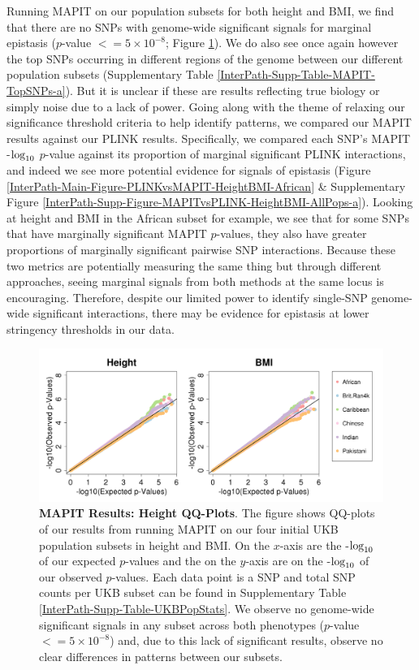 \documentclass[12pt,a4paper]{article}
\def\log{{\rm log}}
\begin{document}
Running MAPIT on our population subsets for both height and BMI, we find that there are no SNPs with genome-wide significant signals for marginal epistasis ($p$-value $<= 5\times10^{-8}$; Figure \ref{InterPath-Main-Figure-MAPIT-HeightBMI}). We do also see once again however the top SNPs occurring in different regions of the genome between our different population subsets (Supplementary Table \ref{InterPath-Supp-Table-MAPIT-TopSNPs-a}). But it is unclear if these are results reflecting true biology or simply noise due to a lack of power. Going along with the theme of relaxing our significance threshold criteria to help identify patterns, we compared our MAPIT results against our PLINK results. Specifically, we compared each SNP's MAPIT -$\log_{10}$ $p$-value against its proportion of marginal significant PLINK interactions, and indeed we see more potential evidence for signals of epistasis (Figure \ref{InterPath-Main-Figure-PLINKvsMAPIT-HeightBMI-African} \& Supplementary Figure \ref{InterPath-Supp-Figure-MAPITvsPLINK-HeightBMI-AllPops-a}). Looking at height and BMI in the African subset for example, we see that for some SNPs that have marginally significant MAPIT $p$-values, they also have greater proportions of marginally significant pairwise SNP interactions. Because these two metrics are potentially measuring the same thing but through different approaches, seeing marginal signals from both methods at the same locus is encouraging. Therefore, despite our limited power to identify single-SNP genome-wide significant interactions, there may be evidence for epistasis at lower stringency thresholds in our data.

\begin{figure}[htb]
\centering
\hspace*{-1.4cm}
\includegraphics[scale=.45]{Images/Main/InterPath_Main_Figure_MAPIT_vs4_HeightBMI.png}
\caption[TBD]{\textbf{MAPIT Results: Height QQ-Plots}. The figure shows QQ-plots of our results from running MAPIT on our four initial UKB population subsets in height and BMI. On the $x$-axis are the -$\log_{10}$ of our expected $p$-values and the on the $y$-axis are on the -$\log_{10}$ of our observed $p$-values. Each data point is a SNP and total SNP counts per UKB subset can be found in Supplementary Table \ref{InterPath-Supp-Table-UKBPopStats}. We observe no genome-wide significant signals in any subset across both phenotypes ($p$-value $<= 5\times10^{-8}$) and, due to this lack of significant results, observe no clear differences in patterns between our subsets.}
\label{InterPath-Main-Figure-MAPIT-HeightBMI}
\end{figure}
\end{document}
